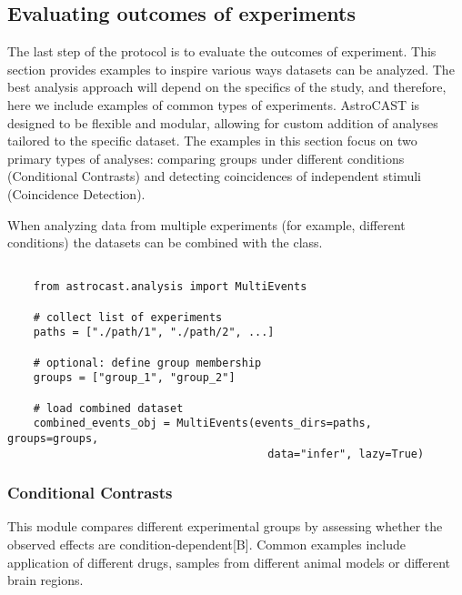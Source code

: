 \subsection{Evaluating outcomes of experiments}


The last step of the protocol is to evaluate the outcomes of experiment. This section provides examples to inspire various ways datasets can be analyzed. The best analysis approach will depend on the specifics of the study, and therefore, here we include examples of common types of experiments. AstroCAST is designed to be flexible and modular, allowing for custom addition of analyses tailored to the specific dataset. The examples in this section focus on two primary types of analyses: comparing groups under different conditions (Conditional Contrasts) and detecting coincidences of independent stimuli (Coincidence Detection).

When analyzing data from multiple experiments (for example, different conditions) the datasets can be combined with the  class.

\begin{lstlisting}[style=pyStyle]

    from astrocast.analysis import MultiEvents

    # collect list of experiments
    paths = ["./path/1", "./path/2", ...]

    # optional: define group membership
    groups = ["group_1", "group_2"]

    # load combined dataset
    combined_events_obj = MultiEvents(events_dirs=paths, groups=groups,
                                        data="infer", lazy=True)

\end{lstlisting}

\subsubsection{Conditional Contrasts}
This module compares different experimental groups by assessing whether the observed effects are condition-dependent[B]. Common examples include application of different drugs, samples from different animal models or different brain regions.

